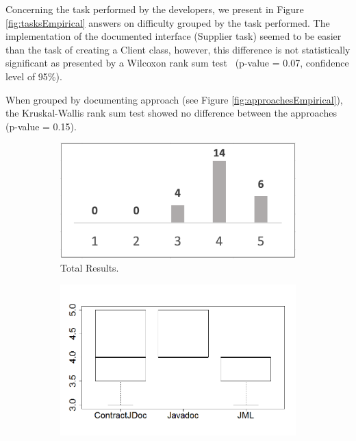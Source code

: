 Concerning the task performed by the developers, we present in
Figure \ref{fig:tasksEmpirical}
answers on difficulty grouped by the task performed.
The implementation of the documented interface (Supplier task) seemed to be easier
than the task of creating a Client class, however, this difference is not
statistically significant as presented by a Wilcoxon rank sum test~\cite{statistical}
(p-value = 0.07, confidence level of 95\%).

When grouped by documenting approach (see Figure \ref{fig:approachesEmpirical}),
the Kruskal-Wallis rank sum test showed no difference between the approaches
(p-value = 0.15).



\begin{figure}
\centering
\begin{subfigure}{.32\textwidth}
\includegraphics[width=1\textwidth]{figs/ExpAnswersTotal.png}
\caption{Total Results.}
\label{fig:ExpAnswersTotal}
\end{subfigure}
\begin{subfigure}{.33\textwidth}
\includegraphics[width=1\linewidth]{figs/boxplotApproachesEmpiricalStudy}

\end{subfigure}
\end{figure}
